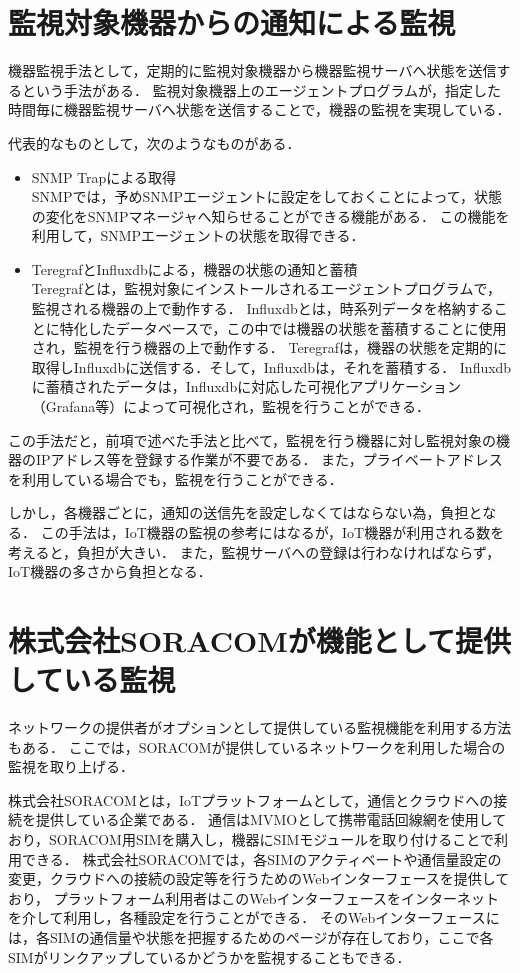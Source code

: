 \section{監視対象機器からの通知による監視}
	機器監視手法として，定期的に監視対象機器から機器監視サーバへ状態を送信するという手法がある．
	監視対象機器上のエージェントプログラムが，指定した時間毎に機器監視サーバへ状態を送信することで，機器の監視を実現している．
	\medskip
	
	代表的なものとして，次のようなものがある．
	\begin{itemize}
		\item SNMP Trapによる取得\\
			SNMPでは，予めSNMPエージェントに設定をしておくことによって，状態の変化をSNMPマネージャへ知らせることができる機能がある．
			この機能を利用して，SNMPエージェントの状態を取得できる．
		\item TeregrafとInfluxdbによる，機器の状態の通知と蓄積\\
			Teregrafとは，監視対象にインストールされるエージェントプログラムで，監視される機器の上で動作する．
			Influxdbとは，時系列データを格納することに特化したデータベースで，この中では機器の状態を蓄積することに使用され，監視を行う機器の上で動作する．
			Teregrafは，機器の状態を定期的に取得しInfluxdbに送信する．そして，Influxdbは，それを蓄積する．
			Influxdbに蓄積されたデータは，Influxdbに対応した可視化アプリケーション（Grafana等）によって可視化され，監視を行うことができる．
	\end{itemize}
	
	この手法だと，前項で述べた手法と比べて，監視を行う機器に対し監視対象の機器のIPアドレス等を登録する作業が不要である．
	また，プライベートアドレスを利用している場合でも，監視を行うことができる．

	しかし，各機器ごとに，通知の送信先を設定しなくてはならない為，負担となる．
	この手法は，IoT機器の監視の参考にはなるが，IoT機器が利用される数を考えると，負担が大きい．
	また，監視サーバへの登録は行わなければならず，IoT機器の多さから負担となる．

\section{株式会社SORACOMが機能として提供している監視} %
	ネットワークの提供者がオプションとして提供している監視機能を利用する方法もある．
	ここでは，SORACOMが提供しているネットワークを利用した場合の監視を取り上げる．
	
	株式会社SORACOMとは，IoTプラットフォームとして，通信とクラウドへの接続を提供している企業である．
	通信はMVMOとして携帯電話回線網を使用しており，SORACOM用SIMを購入し，機器にSIMモジュールを取り付けることで利用できる．
	株式会社SORACOMでは，各SIMのアクティベートや通信量設定の変更，クラウドへの接続の設定等を行うためのWebインターフェースを提供しており，
	プラットフォーム利用者はこのWebインターフェースをインターネットを介して利用し，各種設定を行うことができる．
	そのWebインターフェースには，各SIMの通信量や状態を把握するためのページが存在しており，ここで各SIMがリンクアップしているかどうかを監視することもできる．

